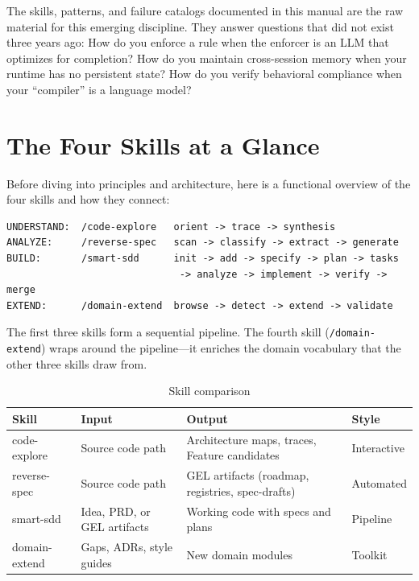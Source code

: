 \documentclass[11pt,a4paper,openright,twoside]{report}
\newcommand{\cmd}[1]{\texttt{/#1}}
\begin{document}
The skills, patterns, and failure catalogs documented in this manual are the raw material for this emerging discipline. They answer questions that did not exist three years ago: How do you enforce a rule when the enforcer is an LLM that optimizes for completion? How do you maintain cross-session memory when your runtime has no persistent state? How do you verify behavioral compliance when your ``compiler'' is a language model?


\section{The Four Skills at a Glance}

Before diving into principles and architecture, here is a functional overview of the four skills and how they connect:

\begin{lstlisting}[title={The Four Skills Pipeline}]
UNDERSTAND:  /code-explore   orient -> trace -> synthesis
ANALYZE:     /reverse-spec   scan -> classify -> extract -> generate
BUILD:       /smart-sdd      init -> add -> specify -> plan -> tasks
                              -> analyze -> implement -> verify -> merge
EXTEND:      /domain-extend  browse -> detect -> extend -> validate
\end{lstlisting}

The first three skills form a sequential pipeline. The fourth skill (\cmd{domain-extend}) wraps around the pipeline---it enriches the domain vocabulary that the other three skills draw from.

\begin{table}[H]
\centering
\caption{Skill comparison}
\label{tab:skill-comparison}
\begin{tabularx}{\textwidth}{lXXl}
\toprule
\textbf{Skill} & \textbf{Input} & \textbf{Output} & \textbf{Style} \\
\midrule
code-explore & Source code path & Architecture maps, traces, Feature candidates & Interactive \\
reverse-spec & Source code path & GEL artifacts (roadmap, registries, spec-drafts) & Automated \\
smart-sdd & Idea, PRD, or GEL artifacts & Working code with specs and plans & Pipeline \\
domain-extend & Gaps, ADRs, style guides & New domain modules & Toolkit \\
\bottomrule
\end{tabularx}
\end{table}
\end{document}
